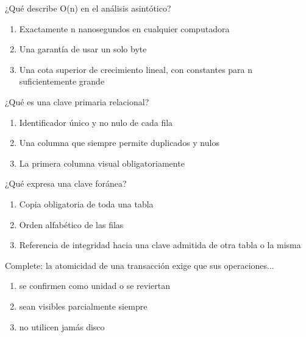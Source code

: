 \noindent\begin{minipage}{\linewidth}\setlength{\parskip}{4pt}\label{q:S-062}
¿Qué describe O(n) en el análisis asintótico?
\begin{enumerate}[label=\Alph*),nosep]
\item Exactamente n nanosegundos en cualquier computadora
\item Una garantía de usar un solo byte
\item Una cota superior de crecimiento lineal, con constantes para n suficientemente grande
\end{enumerate}\end{minipage}\par\medskip

\noindent\begin{minipage}{\linewidth}\setlength{\parskip}{4pt}\label{q:S-063}
¿Qué es una clave primaria relacional?
\begin{enumerate}[label=\Alph*),nosep]
\item Identificador único y no nulo de cada fila
\item Una columna que siempre permite duplicados y nulos
\item La primera columna visual obligatoriamente
\end{enumerate}\end{minipage}\par\medskip

\noindent\begin{minipage}{\linewidth}\setlength{\parskip}{4pt}\label{q:S-064}
¿Qué expresa una clave foránea?
\begin{enumerate}[label=\Alph*),nosep]
\item Copia obligatoria de toda una tabla
\item Orden alfabético de las filas
\item Referencia de integridad hacia una clave admitida de otra tabla o la misma
\end{enumerate}\end{minipage}\par\medskip

\noindent\begin{minipage}{\linewidth}\setlength{\parskip}{4pt}\label{q:S-065}
Complete: la atomicidad de una transacción exige que sus operaciones...
\begin{enumerate}[label=\Alph*),nosep]
\item se confirmen como unidad o se reviertan
\item sean visibles parcialmente siempre
\item no utilicen jamás disco
\end{enumerate}\end{minipage}\par\medskip

